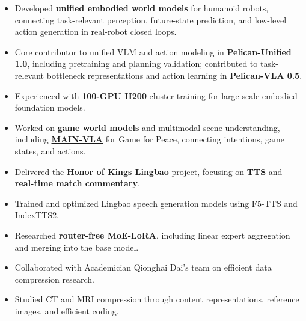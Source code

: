 \documentclass{resume}
\begin{document}
\begin{itemize}
    \item Developed \textbf{unified embodied world models} for humanoid robots, connecting task-relevant perception, future-state prediction, and low-level action generation in real-robot closed loops.
    \item Core contributor to unified VLM and action modeling in \textbf{Pelican-Unified 1.0}, including pretraining and planning validation; contributed to task-relevant bottleneck representations and action learning in \textbf{Pelican-VLA 0.5}.
    \item Experienced with \textbf{100-GPU H200} cluster training for large-scale embodied foundation models.
\end{itemize}

\begin{itemize}
    \item Worked on \textbf{game world models} and multimodal scene understanding, including \href{https://main-vla.github.io/}{\textbf{MAIN-VLA}} for Game for Peace, connecting intentions, game states, and actions.
    \item Delivered the \textbf{Honor of Kings Lingbao} project, focusing on \textbf{TTS} and \textbf{real-time match commentary}.
    \item Trained and optimized Lingbao speech generation models using F5-TTS and IndexTTS2.
    \item Researched \textbf{router-free MoE-LoRA}, including linear expert aggregation and merging into the base model.
\end{itemize}

\begin{itemize}
    \item Collaborated with Academician Qionghai Dai's team on efficient data compression research.
    \item Studied CT and MRI compression through content representations, reference images, and efficient coding.
\end{itemize}
\end{document}
